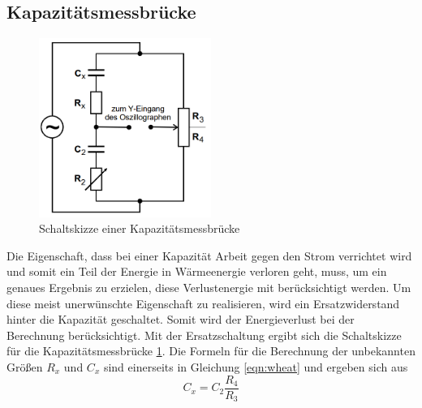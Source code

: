\subsection{Kapazitätsmessbrücke} \label{subsec:capmesbridge}
\begin{figure}
    \centering  
    \caption{Schaltskizze einer Kapazitätsmessbrücke}
    \label{fig:capmesbridge}
    \includegraphics[width = 0.5\textwidth]{bridges/capmesbridge.png}
\end{figure}
Die Eigenschaft, dass bei einer Kapazität Arbeit gegen den Strom verrichtet wird und somit ein Teil der Energie in Wärmeenergie verloren geht, muss, um ein genaues
Ergebnis zu erzielen, diese Verlustenergie mit berücksichtigt werden. Um diese meist unerwünschte Eigenschaft zu realisieren, wird ein Ersatzwiderstand 
hinter die Kapazität geschaltet. Somit wird der Energieverlust bei der Berechnung berücksichtigt. Mit der Ersatzschaltung ergibt sich die Schaltskizze 
für die Kapazitätsmessbrücke \ref{fig:capmesbridge}. Die Formeln für die Berechnung der unbekannten Größen $R_x$ und $C_x$ sind einerseits in Gleichung
\eqref{eqn:wheat} und ergeben sich aus 
\begin{equation}
    C_x = C_2 \frac{R_4}{R_3} \label{eqn:capmes}
\end{equation}
